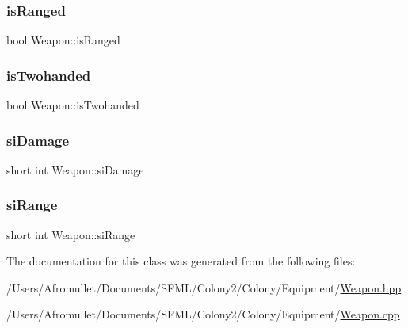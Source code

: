 \subsubsection{\texorpdfstring{is\+Ranged}{isRanged}}
{\footnotesize\ttfamily bool Weapon\+::is\+Ranged\hspace{0.3cm}{\ttfamily [private]}}

\mbox{\label{class_weapon_a790c117505d8bf62c8297b3f87396070}} 
\subsubsection{\texorpdfstring{is\+Twohanded}{isTwohanded}}
{\footnotesize\ttfamily bool Weapon\+::is\+Twohanded\hspace{0.3cm}{\ttfamily [private]}}

\mbox{\label{class_weapon_aedd020151d162c99d7fc5e28f627c517}} 
\subsubsection{\texorpdfstring{si\+Damage}{siDamage}}
{\footnotesize\ttfamily short int Weapon\+::si\+Damage\hspace{0.3cm}{\ttfamily [private]}}

\mbox{\label{class_weapon_afb5789f93e22dfb039d273f0bd4480b0}} 
\subsubsection{\texorpdfstring{si\+Range}{siRange}}
{\footnotesize\ttfamily short int Weapon\+::si\+Range\hspace{0.3cm}{\ttfamily [private]}}



The documentation for this class was generated from the following files\+:\begin{DoxyCompactItemize}
\item 
/\+Users/\+Afromullet/\+Documents/\+S\+F\+M\+L/\+Colony2/\+Colony/\+Equipment/\mbox{\hyperlink{_weapon_8hpp}{Weapon.\+hpp}}\item 
/\+Users/\+Afromullet/\+Documents/\+S\+F\+M\+L/\+Colony2/\+Colony/\+Equipment/\mbox{\hyperlink{_weapon_8cpp}{Weapon.\+cpp}}\end{DoxyCompactItemize}
